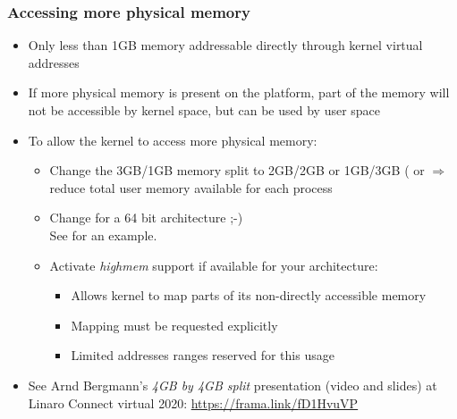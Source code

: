\begin{frame}
  \frametitle{Accessing more physical memory}
  \begin{itemize}
  \item Only less than 1GB memory addressable directly through kernel virtual addresses
  \item If more physical memory is present on the platform, part of
        the memory will not be accessible by kernel space, but can be used
         by user space
  \item To allow the kernel to access more physical memory:
    \begin{itemize}
    \item Change the 3GB/1GB memory split to 2GB/2GB or 1GB/3GB
          ( or 
          $\Rightarrow$ reduce total user memory available for each process
    \item Change for a 64 bit architecture ;-)\\
          See  for an example.
    \item Activate \emph{highmem} support if available for your
          architecture:
      \begin{itemize}
      \item Allows kernel to map parts of its non-directly accessible
            memory
      \item Mapping must be requested explicitly
      \item Limited addresses ranges reserved for this usage
      \end{itemize}
    \end{itemize}
  \item See Arnd Bergmann's {\em 4GB by 4GB split} presentation (video
        and slides) at Linaro Connect virtual 2020: \url{https://frama.link/fD1HvuVP}
  \end{itemize}
\end{frame}

